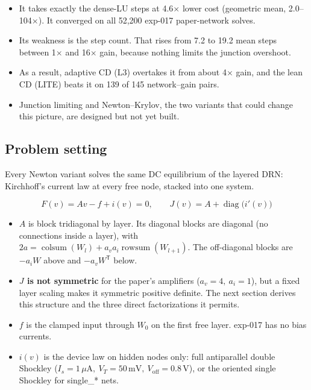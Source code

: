 \documentclass[11pt,a4paper]{article}
\begin{document}
\begin{itemize}
\item It takes exactly the dense-LU steps at 4.6\ensuremath{\times} lower cost (geometric
mean, 2.0--104\ensuremath{\times}). It converged on all 52,200 exp-017 paper-network
solves.
\item Its weakness is the step count. That rises from 7.2 to 19.2 mean steps between
1\ensuremath{\times} and 16\ensuremath{\times} gain, because nothing limits the junction
overshoot.
\item As a result, adaptive CD (L3) overtakes it from about 4\ensuremath{\times} gain, and the
lean CD (LITE) beats it on 139 of 145 network--gain pairs.
\item Junction limiting and Newton--Krylov, the two variants that could change this picture,
are designed but not yet built.
\end{itemize}

\subsection*{Problem setting}

Every Newton variant solves the same DC equilibrium of the layered DRN: Kirchhoff's
current law at every free node, stacked into one system.

\[
F(v) = A v - f + i(v) = 0, \qquad J(v) = A + \operatorname{diag}\big(i'(v)\big)
\]

\begin{itemize}
\item \textbf{$A$} is block tridiagonal by layer. Its diagonal blocks are diagonal (no
connections inside a layer), with $2a=\operatorname{colsum}(W_l)+a_v
a_i\operatorname{rowsum}(W_{l+1})$. The off-diagonal blocks are $-a_iW$ above and
$-a_vW^{\mathsf T}$ below.
\item \textbf{$J$ is not symmetric} for the paper's amplifiers ($a_v=4,\ a_i=1$), but a fixed
layer scaling makes it symmetric positive definite. The next section derives this
structure and the three direct factorizations it permits.
\item \textbf{$f$} is the clamped input through $W_{0}$ on the first free layer. exp-017 has
no bias currents.
\item \textbf{$i(v)$} is the device law on hidden nodes only: full antiparallel double
Shockley ($I_s=1\,\mu\mathrm{A},\ V_T=50\,\mathrm{mV},\
V_{\mathrm{off}}=0.8\,\mathrm{V}$), or the oriented single Shockley for single\_* nets.
\end{itemize}
\end{document}
